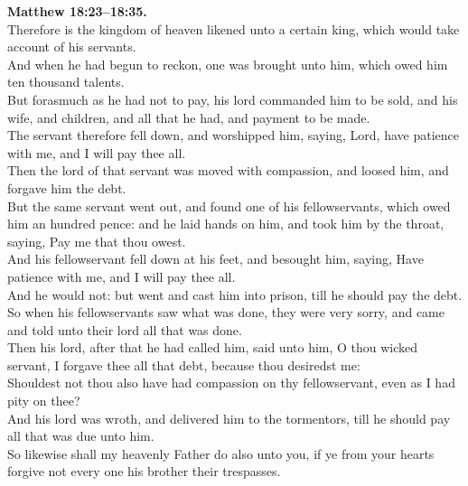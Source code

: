 \documentclass[10pt]{article} %
\begin{document}
{\begin{minipage}[t]{0.45\textwidth}
\textbf{Matthew 18:23--18:35.}\\
Therefore is the kingdom of heaven likened unto a certain king, which would take account of his servants.\\
And when he had begun to reckon, one was brought unto him, which owed him ten thousand talents.\\
But forasmuch as he had not to pay, his lord commanded him to be sold, and his wife, and children, and all that he had, and payment to be made.\\
The servant therefore fell down, and worshipped him, saying, Lord, have patience with me, and I will pay thee all.\\
Then the lord of that servant was moved with compassion, and loosed him, and forgave him the debt.\\
But the same servant went out, and found one of his fellowservants, which owed him an hundred pence: and he laid hands on him, and took him by the throat, saying, Pay me that thou owest.\\
And his fellowservant fell down at his feet, and besought him, saying, Have patience with me, and I will pay thee all.\\
And he would not: but went and cast him into prison, till he should pay the debt.\\
So when his fellowservants saw what was done, they were very sorry, and came and told unto their lord all that was done.\\
Then his lord, after that he had called him, said unto him, O thou wicked servant, I forgave thee all that debt, because thou desiredst me:\\
Shouldest not thou also have had compassion on thy fellowservant, even as I had pity on thee?\\
And his lord was wroth, and delivered him to the tormentors, till he should pay all that was due unto him.\\
So likewise shall my heavenly Father do also unto you, if ye from your hearts forgive not every one his brother their trespasses.\\

\end{minipage}}
\vspace*{\fill}
\newpage
\Huge%
\vspace*{\fill}
\end{document}
